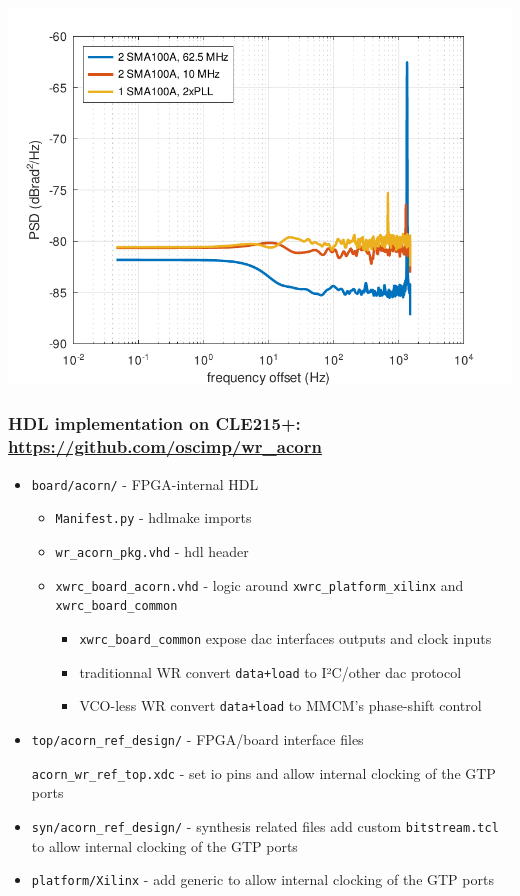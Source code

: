 \documentclass[compress,10pt,aspectratio=169]{beamer}
\begin{document}
\begin{frame}[fragile]
\begin{minipage}[t]{1.06\linewidth}
\begin{minipage}{.49\linewidth}
\includegraphics[width=1.05\linewidth]{62p5MHz.pdf}
\end{minipage}
\end{minipage}
\end{frame}

\begin{frame}[fragile]\frametitle{HDL implementation on CLE215+: {\footnotesize\url{https://github.com/oscimp/wr_acorn}}}

  \begin{itemize}
    \item \texttt{board/acorn/} - FPGA-internal HDL
      \begin{itemize}
        \item \texttt{Manifest.py} - hdlmake imports
        \item \texttt{wr\_acorn\_pkg.vhd} - hdl header
        \item \texttt{xwrc\_board\_acorn.vhd} - logic around \texttt{xwrc\_platform\_xilinx} and \texttt{xwrc\_board\_common}
          \begin{itemize}
            \item \texttt{xwrc\_board\_common} expose dac interfaces outputs and clock inputs
            \item traditionnal WR convert \texttt{data+load} to I²C/other dac protocol
            \item VCO-less WR convert \texttt{data+load} to MMCM's phase-shift control
          \end{itemize}
      \end{itemize}
    \item \texttt{top/acorn\_ref\_design/} - FPGA/board interface files

          \texttt{acorn\_wr\_ref\_top.xdc} - set io pins and allow internal clocking of the GTP ports
    \item \texttt{syn/acorn\_ref\_design/} - synthesis related files
          add custom \texttt{bitstream.tcl} to allow internal clocking of the GTP ports
    \item \texttt{platform/Xilinx} - add generic to allow internal clocking of the GTP ports
  \end{itemize}

\end{frame}
\end{document}
